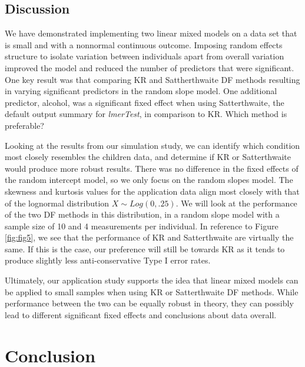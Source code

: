 \documentclass[12pt, twoside]{amherstthesis}
\begin{document}
\hypertarget{discussion-1}{%
\section{Discussion}\label{discussion-1}}

We have demonstrated implementing two linear mixed models on a data set that is small and with a nonnormal continuous outcome. Imposing random effects structure to isolate variation between individuals apart from overall variation improved the model and reduced the number of predictors that were significant. One key result was that comparing KR and Sattherthwaite DF methods resulting in varying significant predictors in the random slope model. One additional predictor, alcohol, was a significant fixed effect when using Satterthwaite, the default output summary for \emph{lmerTest}, in comparison to KR. Which method is preferable?

Looking at the results from our simulation study, we can identify which condition most closely resembles the children data, and determine if KR or Satterthwaite would produce more robust results. There was no difference in the fixed effects of the random intercept model, so we only focus on the random slopes model. The skewness and kurtosis values for the application data align most closely with that of the lognormal distribution \(X\sim\mathit{Log}(0,.25).\) We will look at the performance of the two DF methods in this distribution, in a random slope model with a sample size of 10 and 4 measurements per individual. In reference to Figure \ref{fig:fig5}, we see that the performance of KR and Satterthwaite are virtually the same. If this is the case, our preference will still be towards KR as it tends to produce slightly less anti-conservative Type I error rates.

Ultimately, our application study supports the idea that linear mixed models can be applied to small samples when using KR or Satterthwaite DF methods. While performance between the two can be equally robust in theory, they can possibly lead to different significant fixed effects and conclusions about data overall.

\hypertarget{conclusion-1}{%
\chapter*{Conclusion}\label{conclusion-1}}
\end{document}
